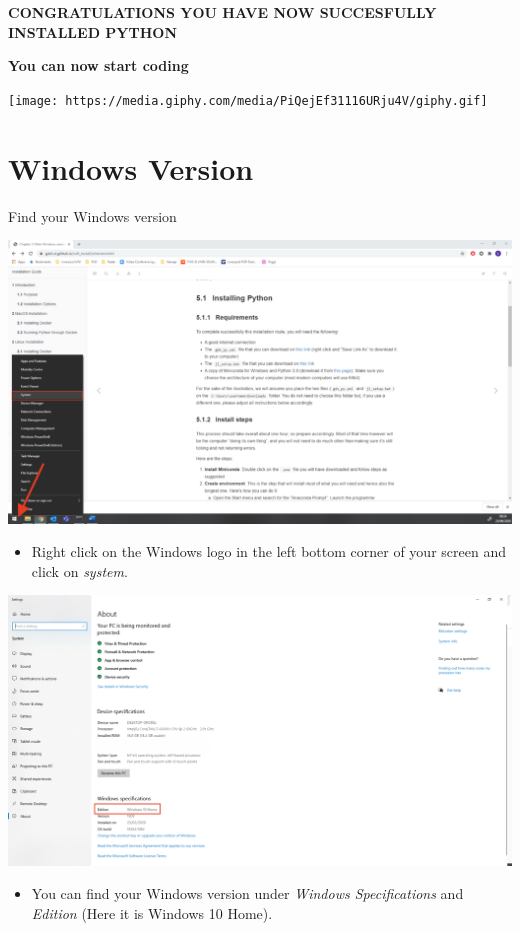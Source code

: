 \documentclass[
]{book}
\providecommand{\tightlist}{%
  \setlength{\itemsep}{0pt}\setlength{\parskip}{0pt}}
\begin{document}
\textbf{CONGRATULATIONS YOU HAVE NOW SUCCESFULLY INSTALLED PYTHON}

\textbf{You can now start coding}

\texttt{[image: https://media.giphy.com/media/PiQejEf31116URju4V/giphy.gif]}

\hypertarget{windows-version}{%
\chapter*{Windows Version}\label{windows-version}}

Find your Windows version

\begin{center}\includegraphics[width=29.85in]{figs/chp5/Picture7} \end{center}

\begin{itemize}
\tightlist
\item
  Right click on the Windows logo in the left bottom corner of your screen and click on \emph{system}.
\end{itemize}

\begin{center}\includegraphics[width=67.29in]{figs/chp5/Version_tut_1} \end{center}

\begin{itemize}
\tightlist
\item
  You can find your Windows version under \emph{Windows Specifications} and \emph{Edition} (Here it is Windows 10 Home).
\end{itemize}

  
\end{document}
